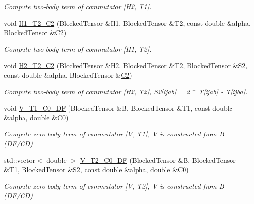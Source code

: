 \begin{DoxyCompactItemize}
\begin{DoxyCompactList}\small\item\em Compute two-\/body term of commutator \mbox{[}H2, T1\mbox{]}. \end{DoxyCompactList}\item 
void \mbox{\hyperlink{classforte_1_1_s_a_d_s_r_g_aaa2c51631d5979f1d7b44a3d6a6d71b6}{H1\+\_\+\+T2\+\_\+\+C2}} (Blocked\+Tensor \&H1, Blocked\+Tensor \&T2, const double \&alpha, Blocked\+Tensor \&\mbox{\hyperlink{namespaceforte_abe00ec86d0015c0f2b6ac298c6e428e4af1a543f5a2c5d49bc5dde298fcf716e4}{C2}})
\begin{DoxyCompactList}\small\item\em Compute two-\/body term of commutator \mbox{[}H1, T2\mbox{]}. \end{DoxyCompactList}\item 
void \mbox{\hyperlink{classforte_1_1_s_a_d_s_r_g_adaa24b0e25e20d7e0704e21a449c3435}{H2\+\_\+\+T2\+\_\+\+C2}} (Blocked\+Tensor \&H2, Blocked\+Tensor \&T2, Blocked\+Tensor \&S2, const double \&alpha, Blocked\+Tensor \&\mbox{\hyperlink{namespaceforte_abe00ec86d0015c0f2b6ac298c6e428e4af1a543f5a2c5d49bc5dde298fcf716e4}{C2}})
\begin{DoxyCompactList}\small\item\em Compute two-\/body term of commutator \mbox{[}H2, T2\mbox{]}, S2\mbox{[}ijab\mbox{]} = 2 $\ast$ T\mbox{[}ijab\mbox{]} -\/ T\mbox{[}ijba\mbox{]}. \end{DoxyCompactList}\item 
void \mbox{\hyperlink{classforte_1_1_s_a_d_s_r_g_a6c409bc7d2f3a1be9a87f0d2205196c2}{V\+\_\+\+T1\+\_\+\+C0\+\_\+\+DF}} (Blocked\+Tensor \&B, Blocked\+Tensor \&T1, const double \&alpha, double \&C0)
\begin{DoxyCompactList}\small\item\em Compute zero-\/body term of commutator \mbox{[}V, T1\mbox{]}, V is constructed from B (D\+F/\+CD) \end{DoxyCompactList}\item 
std\+::vector$<$ double $>$ \mbox{\hyperlink{classforte_1_1_s_a_d_s_r_g_a047a7d32f855329819af37ec1be6cff7}{V\+\_\+\+T2\+\_\+\+C0\+\_\+\+DF}} (Blocked\+Tensor \&B, Blocked\+Tensor \&T1, Blocked\+Tensor \&S2, const double \&alpha, double \&C0)
\begin{DoxyCompactList}\small\item\em Compute zero-\/body term of commutator \mbox{[}V, T2\mbox{]}, V is constructed from B (D\+F/\+CD) \end{DoxyCompactList}\item 

\end{DoxyCompactItemize}

